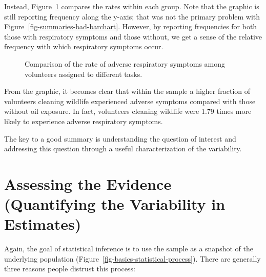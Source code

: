 \documentclass[
  letterpaper,
  DIV=11,
  numbers=noendperiod]{scrreprt}
\theoremstyle{definition}
\theoremstyle{definition}
\theoremstyle{plain}
\theoremstyle{remark}
\begin{document}
Instead, Figure~\ref{fig-summaries-good-barchart} compares the rates
within each group. Note that the graphic is still reporting frequency
along the y-axis; that was not the primary problem with
Figure~\ref{fig-summaries-bad-barchart}. However, by reporting
frequencies for both those with respiratory symptoms and those without,
we get a sense of the relative frequency with which respiratory symptoms
occur.

\begin{figure}


\caption{\label{fig-summaries-good-barchart}Comparison of the rate of
adverse respiratory symptoms among volunteers assigned to different
tasks.}

\end{figure}%

From the graphic, it becomes clear that within the sample a higher
fraction of volunteers cleaning wildlife experienced adverse symptoms
compared with those without oil exposure. In fact, volunteers cleaning
wildlife were 1.79 times more likely to experience adverse respiratory
symptoms.

The key to a good summary is understanding the question of interest and
addressing this question through a useful characterization of the
variability.

\chapter{Assessing the Evidence (Quantifying the Variability in
Estimates)}\label{sec-samplingdistns}

Again, the goal of statistical inference is to use the sample as a
snapshot of the underlying population
(Figure~\ref{fig-basics-statistical-process}). There are generally three
reasons people distrust this process:
\end{document}
